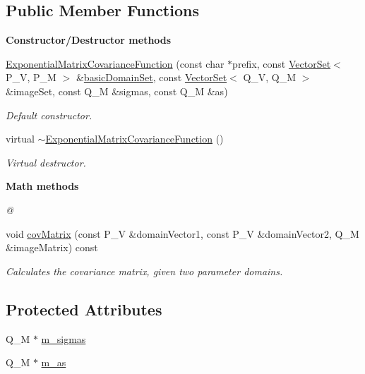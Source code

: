 \subsection*{Public Member Functions}
\begin{Indent}{\bf Constructor/\-Destructor methods}\par
\begin{DoxyCompactItemize}
\item 
\hyperlink{class_q_u_e_s_o_1_1_exponential_matrix_covariance_function_a15ab626ab0e3ee4adcdc4460d79a8cb7}{Exponential\-Matrix\-Covariance\-Function} (const char $\ast$prefix, const \hyperlink{class_q_u_e_s_o_1_1_vector_set}{Vector\-Set}$<$ P\-\_\-\-V, P\-\_\-\-M $>$ \&\hyperlink{class_q_u_e_s_o_1_1_base_matrix_covariance_function_a6ce876e4dae5ab4b165ac100e310dd45}{basic\-Domain\-Set}, const \hyperlink{class_q_u_e_s_o_1_1_vector_set}{Vector\-Set}$<$ Q\-\_\-\-V, Q\-\_\-\-M $>$ \&image\-Set, const Q\-\_\-\-M \&sigmas, const Q\-\_\-\-M \&as)
\begin{DoxyCompactList}\small\item\em Default constructor. \end{DoxyCompactList}\item 
virtual \hyperlink{class_q_u_e_s_o_1_1_exponential_matrix_covariance_function_aa3141a3558de01ca06ca39698e872396}{$\sim$\-Exponential\-Matrix\-Covariance\-Function} ()
\begin{DoxyCompactList}\small\item\em Virtual destructor. \end{DoxyCompactList}\end{DoxyCompactItemize}
\end{Indent}
\begin{Indent}{\bf Math methods}\par
{\em @ }\begin{DoxyCompactItemize}
\item 
void \hyperlink{class_q_u_e_s_o_1_1_exponential_matrix_covariance_function_a039c72a29ea453320cbdb2a6e54a360a}{cov\-Matrix} (const P\-\_\-\-V \&domain\-Vector1, const P\-\_\-\-V \&domain\-Vector2, Q\-\_\-\-M \&image\-Matrix) const 
\begin{DoxyCompactList}\small\item\em Calculates the covariance matrix, given two parameter domains. \end{DoxyCompactList}\end{DoxyCompactItemize}
\end{Indent}
\subsection*{Protected Attributes}
\begin{DoxyCompactItemize}
\item 
Q\-\_\-\-M $\ast$ \hyperlink{class_q_u_e_s_o_1_1_exponential_matrix_covariance_function_a4da6af8ffd336294a3d7a89c5258099e}{m\-\_\-sigmas}
\item 
Q\-\_\-\-M $\ast$ \hyperlink{class_q_u_e_s_o_1_1_exponential_matrix_covariance_function_a63e36890c98437a802ba59be08fb166b}{m\-\_\-as}
\end{DoxyCompactItemize}


